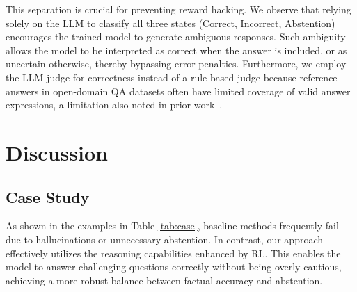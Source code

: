 \documentclass{article} %
\begin{document}
This separation is crucial for preventing reward hacking.
We observe that relying solely on the LLM to classify all three states (Correct, Incorrect, Abstention) encourages the trained model to generate ambiguous responses.
Such ambiguity allows the model to be interpreted as correct when the answer is included, or as uncertain otherwise, thereby bypassing error penalties.
Furthermore, we employ the LLM judge for correctness instead of a rule-based judge because reference answers in open-domain QA datasets often have limited coverage of valid answer expressions, a limitation also noted in prior work~\citep{truthrl}.




\section{Discussion}
\label{appendix:discussion}

\subsection{Case Study}
\label{sec: case study}
As shown in the examples in Table \ref{tab:case}, baseline methods frequently fail due to hallucinations or unnecessary abstention. 
In contrast, our approach effectively utilizes the reasoning capabilities enhanced by RL.
This enables the model to answer challenging questions correctly without being overly cautious, achieving a more robust balance between factual accuracy and abstention.
\end{document}
